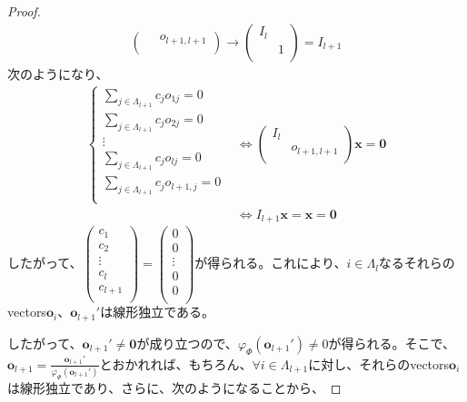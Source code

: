\documentclass[dvipdfmx]{jsarticle}
\begin{document}
\begin{proof}
\begin{align*}
\begin{pmatrix}
\mathbf{\ } & o_{l + 1,l + 1} \\
\end{pmatrix} \rightarrow \begin{pmatrix}
I_{l} & \  \\
\mathbf{\ } & 1 \\
\end{pmatrix} = I_{l + 1}
\end{align*}
次のようになり、
\begin{align*}
\left\{ \begin{matrix}
\sum_{j \in \varLambda_{l + 1}} {c_{j}o_{1j}} = 0 \\
\sum_{j \in \varLambda_{l + 1}} {c_{j}o_{2j}} = 0 \\
 \vdots \\
\sum_{j \in \varLambda_{l + 1}} {c_{j}o_{lj}} = 0 \\
\sum_{j \in \varLambda_{l + 1}} {c_{j}o_{l + 1,j}} = 0 \\
\end{matrix} \right. &\Leftrightarrow \begin{pmatrix}
I_{l} & \  \\
\mathbf{\ } & o_{l + 1,l + 1} \\
\end{pmatrix}\mathbf{x} = \mathbf{0}\\
&\Leftrightarrow I_{l + 1}\mathbf{x} = \mathbf{x} = \mathbf{0}
\end{align*}
したがって、$\begin{pmatrix}
c_{1} \\
c_{2} \\
 \vdots \\
c_{l} \\
c_{l + 1} \\
\end{pmatrix} = \begin{pmatrix}
0 \\
0 \\
 \vdots \\
0 \\
0 \\
\end{pmatrix}$が得られる。これにより、$i \in \varLambda_{l}$なるそれらのvectors$\mathbf{o}_{i}$、$\mathbf{o}_{l + 1}'$は線形独立である。\par
したがって、$\mathbf{o}_{l + 1}' \neq \mathbf{0}$が成り立つので、$\varphi_{\varPhi}\left( \mathbf{o}_{l + 1}' \right) \neq 0$が得られる。そこで、$\mathbf{o}_{l + 1} = \frac{\mathbf{o}_{l + 1}'}{\varphi_{\varPhi}\left( \mathbf{o}_{l + 1}' \right)}$とおかれれば、もちろん、$\forall i \in \varLambda_{l + 1}$に対し、それらのvectors$\mathbf{o}_{i}$は線形独立であり、さらに、次のようになることから、

\end{proof}
\end{document}
